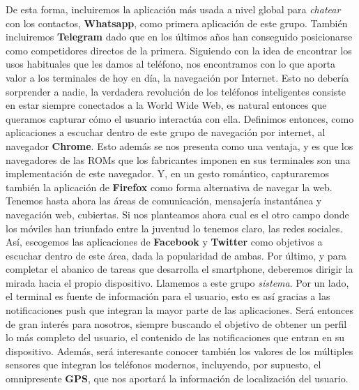 \documentclass[12pt,a4paper,oneside]{book} %
\begin{document}
De esta forma, incluiremos la aplicación más usada a nivel global para \textit{chatear} con los contactos, \textbf{Whatsapp}, como primera aplicación de este grupo. También incluiremos \textbf{Telegram} dado que en los últimos años han conseguido posicionarse como competidores directos de la primera. 
\newline \newline 
Siguiendo con la idea de encontrar los usos habituales que les damos al teléfono, nos encontramos con lo que aporta valor a los terminales de hoy en día, la navegación por Internet. Esto no debería sorprender a nadie, la verdadera revolución de los teléfonos inteligentes consiste en estar siempre conectados a la World Wide Web, es natural entonces que queramos capturar cómo el usuario interactúa con ella.
\newline \newline 
Definimos entonces, como aplicaciones a escuchar dentro de este grupo de navegación por internet, al navegador \textbf{Chrome}. Esto además se nos presenta como una ventaja, y es que los navegadores de las ROMs que los fabricantes imponen en sus terminales son una implementación de este navegador. Y, en un gesto romántico, capturaremos también la aplicación de \textbf{Firefox} como forma alternativa de navegar la web. 
\newline \newline 
Tenemos hasta ahora las áreas de comunicación, mensajería instantánea y navegación web, cubiertas. Si nos planteamos ahora cual es el otro campo donde los móviles han triunfado entre la juventud lo tenemos claro, las redes sociales. Así, escogemos las aplicaciones de \textbf{Facebook} y \textbf{Twitter} como objetivos a escuchar dentro de este área, dada la popularidad de ambas. 
\newline \newline 
Por último, y para completar el abanico de tareas que desarrolla el smartphone, deberemos dirigir la mirada hacia el propio dispositivo. Llamemos a este grupo \textit{sistema}. Por un lado, el terminal es fuente de información para el usuario, esto es así gracias a las notificaciones push que integran la mayor parte de las aplicaciones. Será entonces de gran interés para nosotros, siempre buscando el objetivo de obtener un perfil lo más completo del usuario, el contenido de las notificaciones que entran en su dispositivo. Además, será interesante conocer también los valores de los múltiples sensores que integran los teléfonos modernos, incluyendo, por supuesto, el omnipresente \textbf{GPS}, que nos aportará la información de localización del usuario. 
\end{document}
